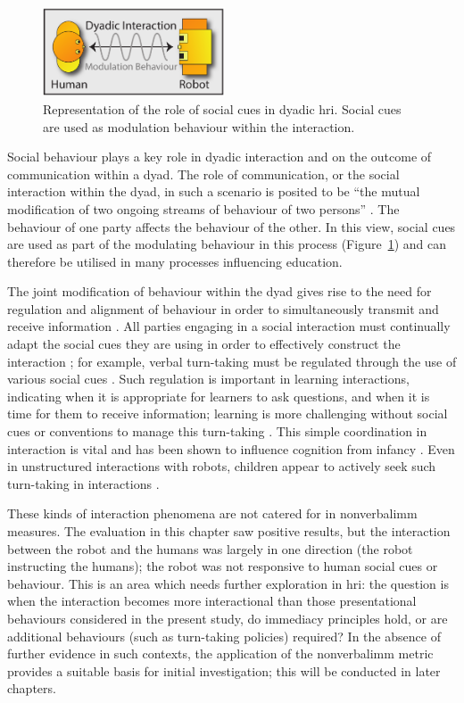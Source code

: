 \begin{figure}[t]
	\centering
    \includegraphics[width=0.48\textwidth]{images/ch4_DyadInteraction.pdf}
    \caption{Representation of the role of social cues in dyadic \acrshort{hri}. Social cues are used as modulation behaviour within the interaction.}
   \label{fig:ch4_dyadinteraction}
\end{figure}

Social behaviour plays a key role in dyadic interaction and on the outcome of communication within a dyad. The role of communication, or the social interaction within the dyad, in such a scenario is posited to be ``the mutual modification of two ongoing streams of behaviour of two persons'' \citep{beebe1992dyadic}. The behaviour of one party affects the behaviour of the other. In this view, social cues are used as part of the modulating behaviour in this process (Figure~\ref{fig:ch4_dyadinteraction}) and can therefore be utilised in many processes influencing education.

The joint modification of behaviour within the dyad gives rise to the need for regulation and alignment of behaviour in order to simultaneously transmit and receive information \citep{jaffe2001rhythms}. All parties engaging in a social interaction must continually adapt the social cues they are using in order to effectively construct the interaction \citep{green1985reading}; for example, verbal turn-taking must be regulated through the use of various social cues \citep{beebe1992dyadic}. Such regulation is important in learning interactions, indicating when it is appropriate for learners to ask questions, and when it is time for them to receive information; learning is more challenging without social cues or conventions to manage this turn-taking \citep{nicol2003social}. This simple coordination in interaction is vital and has been shown to influence cognition from infancy \citep{jaffe2001rhythms}. Even in unstructured interactions with robots, children appear to actively seek such turn-taking in interactions \citep{baxter2013emergence}.

These kinds of interaction phenomena are not catered for in \gls{nonverbalimm} measures. The evaluation in this chapter saw positive results, but the interaction between the robot and the humans was largely in one direction (the robot instructing the humans); the robot was not responsive to human social cues or behaviour. This is an area which needs further exploration in \acrshort{hri}: the question is when the interaction becomes more interactional than those presentational behaviours considered in the present study, do \gls{immediacy} principles hold, or are additional behaviours (such as turn-taking policies) required? In the absence of further evidence in such contexts, the application of the \gls{nonverbalimm} metric provides a suitable basis for initial investigation; this will be conducted in later chapters.

